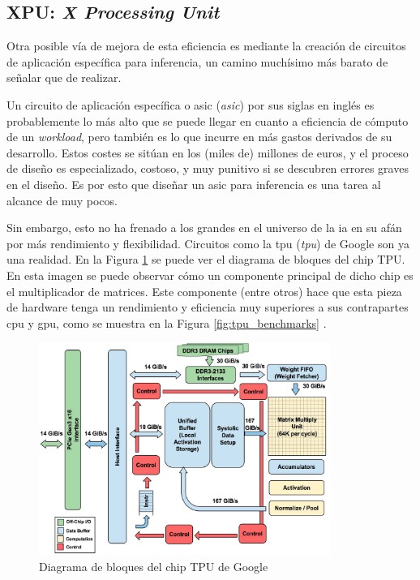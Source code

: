 \subsection{XPU: \textit{X Processing Unit}}
\label{ssec:xpu}
Otra posible vía de mejora de esta eficiencia es mediante la creación de circuitos de aplicación específica para inferencia, un camino muchísimo más barato de señalar que de realizar.

Un circuito de aplicación específica o \acrshort{asic} (\textit{\acrlong{asic}}) por sus siglas en inglés es probablemente lo más alto que se puede llegar en cuanto a eficiencia de cómputo de un \textit{workload}, pero también es lo que incurre en más gastos derivados de su desarrollo. Estos costes se sitúan en los (miles de) millones de euros, y el proceso de diseño es especializado, costoso, y muy punitivo si se descubren errores graves en el diseño. Es por esto que diseñar un \acrshort{asic} para inferencia es una tarea al alcance de muy pocos.


Sin embargo, esto no ha frenado a los grandes en el universo de la \acrshort{ia} en su afán por más rendimiento y flexibilidad. Circuitos como la \acrshort{tpu} (\textit{\acrlong{tpu}}) de Google son ya una realidad. En la Figura \ref{fig:tpu_block_diagram} \cite{jouppi2017_in_datacenter_tpu} se puede ver el diagrama de bloques del chip TPU. En esta imagen se puede observar cómo un componente principal de dicho chip es el multiplicador de matrices. Este componente (entre otros) hace que esta pieza de hardware tenga un rendimiento y eficiencia muy superiores a sus contrapartes \acrshort{cpu} y \acrshort{gpu}, como se muestra en la Figura \ref{fig:tpu_benchmarks} \cite{devopedia_tpu}.

\begin{figure}[h!]
    \centering
    \includegraphics[width=0.85\textwidth]{img/tpu_block_diagram.jpg}
    \caption{Diagrama de bloques del chip TPU de Google}
    \label{fig:tpu_block_diagram}
\end{figure}


